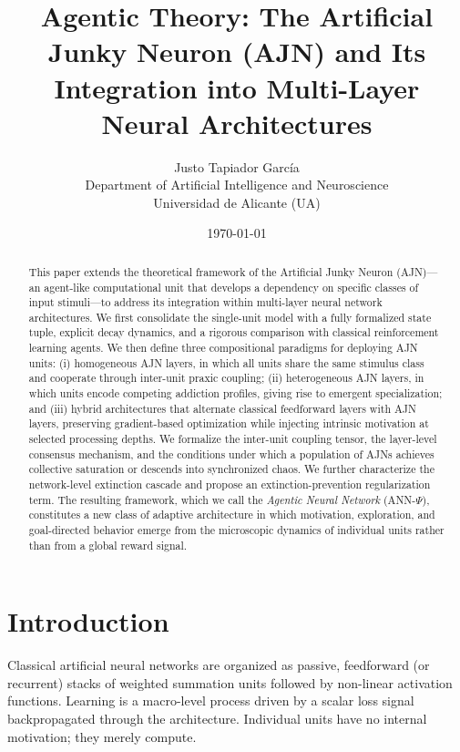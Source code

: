 \documentclass[12pt,a4paper]{article}
\title{\textbf{Agentic Theory: The Artificial Junky Neuron (AJN) and Its\\
Integration into Multi-Layer Neural Architectures}}
\author{Justo Tapiador García \\
Department of Artificial Intelligence and Neuroscience \\
Universidad de Alicante (UA)}
\date{\today}
\begin{document}
\maketitle

\begin{abstract}
This paper extends the theoretical framework of the Artificial Junky Neuron (AJN)---an
agent-like computational unit that develops a dependency on specific classes of input
stimuli---to address its integration within multi-layer neural network architectures.
We first consolidate the single-unit model with a fully formalized state tuple, explicit
decay dynamics, and a rigorous comparison with classical reinforcement learning agents.
We then define three compositional paradigms for deploying AJN units: (i) homogeneous
AJN layers, in which all units share the same stimulus class and cooperate through
inter-unit praxic coupling; (ii) heterogeneous AJN layers, in which units encode
competing addiction profiles, giving rise to emergent specialization; and (iii) hybrid
architectures that alternate classical feedforward layers with AJN layers, preserving
gradient-based optimization while injecting intrinsic motivation at selected processing
depths. We formalize the inter-unit coupling tensor, the layer-level consensus mechanism,
and the conditions under which a population of AJNs achieves collective saturation or
descends into synchronized chaos. We further characterize the network-level extinction
cascade and propose an extinction-prevention regularization term. The resulting framework,
which we call the \textit{Agentic Neural Network} (ANN-$\Psi$), constitutes a new
class of adaptive architecture in which motivation, exploration, and goal-directed
behavior emerge from the microscopic dynamics of individual units rather than from
a global reward signal.
\end{abstract}

\tableofcontents
\newpage

\section{Introduction}

Classical artificial neural networks are organized as passive, feedforward (or
recurrent) stacks of weighted summation units followed by non-linear activation
functions. Learning is a macro-level process driven by a scalar loss signal
backpropagated through the architecture. Individual units have no internal
motivation; they merely compute.
\end{document}
